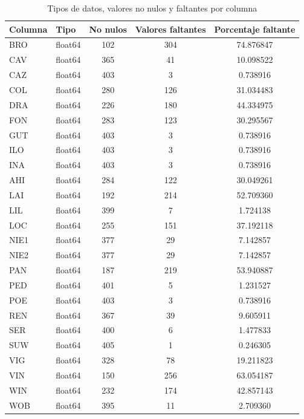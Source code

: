 \documentclass[a4paper,11pt]{article}
\begin{document}
\begin{table}[ht]
    \centering
    \caption{Tipos de datos, valores no nulos y faltantes por columna}
    \label{tab:info_datos}
    \begin{tabular}{|l|l|c|c|c|}
        \hline
        Columna & Tipo & No nulos & Valores faltantes & Porcentaje faltante \\
        \hline
        BRO & float64 & 102 & 304 & 74.876847 \\
        CAV  & float64 & 365 & 41 & 10.098522 \\
        CAZ  & float64 & 403 & 3 & 0.738916 \\
        COL    & float64 & 280 & 126 & 31.034483 \\
        DRA  & float64 & 226 & 180 & 44.334975 \\
        FON  & float64 & 283 & 123 & 30.295567 \\
        GUT  & float64 & 403 & 3 & 0.738916 \\
        ILO & float64 & 403 & 3 & 0.738916 \\
        INA  & float64 & 403 & 3 & 0.738916 \\
        AHI & float64 & 284 & 122 & 30.049261 \\
        LAI  & float64 & 192 & 214 & 52.709360 \\
        LIL & float64 & 399 & 7 & 1.724138 \\
        LOC  & float64 & 255 & 151 & 37.192118 \\
        NIE1 & float64 & 377 & 29 & 7.142857 \\
        NIE2 & float64 & 377 & 29 & 7.142857 \\
        PAN  & float64 & 187 & 219 & 53.940887 \\
        PED  & float64 & 401 & 5 & 1.231527 \\
        POE  & float64 & 403 & 3 & 0.738916 \\
        REN  & float64 & 367 & 39 & 9.605911 \\
        SER & float64 & 400 & 6 & 1.477833 \\
        SUW  & float64 & 405 & 1 & 0.246305 \\
        VIG  & float64 & 328 & 78 & 19.211823 \\
        VIN  & float64 & 150 & 256 & 63.054187 \\
        WIN & float64 & 232 & 174 & 42.857143 \\
        WOB  & float64 & 395 & 11 & 2.709360 \\
        \hline
    \end{tabular}
\end{table}
\end{document}

